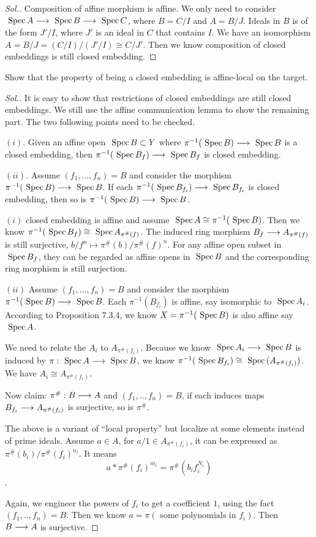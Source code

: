 \documentclass[11pt]{book} %
\begin{document}
\begin{proof}[Sol.]
Composition of affine morphism is affine. We only need to consider $\text{ Spec\,} A\longrightarrow \text{ Spec\,} B\longrightarrow\text{ Spec\,} C $, where $B=C/I$ and $A=B/J$. Ideals in $B$ is of the form $J'/I$, where $J'$ is an ideal in $C$ that contains $I$. We  have an isomorphism $A=B/J=(C/I)/(J'/I)\cong C/J'$. Then we know composition of closed embeddings is still closed embedding.
\end{proof}
\begin{exr}
Show that the property of being a closed embedding is affine-local on the target.
\end{exr}
\begin{proof}[Sol.]
It is easy to show that restrictions of closed embeddings are still closed embeddings. We still use the affine communication lemma to show the remaining part. The two following points need to be checked.

$(i)$. Given an affine open $\text{ Spec\,} B\subset Y$ where $\pi^{-1}(\text{ Spec\,} B)\longrightarrow \text{ Spec\,} B$ is a closed embedding, then $\pi^{-1}(\text{ Spec\,} B_f)\longrightarrow \text{ Spec\,} B_{f}$ is closed embedding.

$(ii)$. Assume $(f_1,...,f_n)=B$ and consider the morphism $\pi^{-1}(\text{ Spec\,} B)\longrightarrow \text{ Spec\,} B$. If each $\pi^{-1}(\text{ Spec\,} B_{f_i})\longrightarrow \text{ Spec\,} B_{f_i}$ is closed embedding, then so is $\pi^{-1}(\text{ Spec\,} B)\longrightarrow \text{ Spec\,} B$. 

$(i)$ closed embedding is affine and assume $\text{ Spec\,} A\cong \pi^{-1}(\text{ Spec\,} B)$. Then we know $\pi^{-1}(\text{ Spec\,} B_f)\cong \text{ Spec\,} A_{\pi^\#(f)}$. The induced ring morphism $B_f\longrightarrow A_{\pi^\#(f)}$ is still surjective, $b/f^n\mapsto \pi^\#(b)/\pi^{\#}(f)^n$. For any affine open subset in $\text{ Spec\,} B_{f}$, they can be regarded as affine opens in $\text{ Spec\,} B$ and the corresponding ring morphism is still surjection.

$(ii)$ Assume $(f_1,...,f_n)=B$ and consider the morphism $\pi^{-1}(\text{ Spec\,} B)\longrightarrow \text{ Spec\,} B$. Each $\pi^{-1}(B_{f_i})$ is affine, say isomorphic to $\text{ Spec\,} A_i$. According to Proposition 7.3.4, we know $X=\pi^{-1}(\text{ Spec\,} B)$ is also affine say $\text{ Spec\,} A$.

We need to relate the $A_i$ to $A_{\pi^\#(f_i)}$. Because we know $\text{ Spec\,} A_i\longrightarrow \text{ Spec\,} B$ is induced by $\pi:\text{ Spec\,} A\longrightarrow \text{ Spec\,} B$, we know $\pi^{-1}(\text{ Spec\,} B_{f_i})\cong \text{ Spec\,} (A_{\pi^{\#}(f_i)})$. We have $A_i\cong A_{\pi^\#(f_i)}$.

Now claim: $\pi^\#:B\longrightarrow A$ and $(f_1,..,f_n)=B$, if each induces maps $B_{f_i}\longrightarrow A_{\pi^{\#}(f_i)}$ is surjective, so is $\pi^\#$.

The above is a variant of ``local property'' but localize at some elements instead of prime ideals. Assume $a\in A$, for $a/1\in A_{\pi^{\#}(f_i)}$, it can be expressed as $\pi^\#(b_i)/\pi^\#(f_i)^{n_i}$. It means
 $$a*\pi^\#(f_{i})^{m_i}= \pi^\#(b_i f_{i}^{N_i})$$.

Again, we engineer the powers of $f_i$ to get a coefficient $1$, using the fact $(f_1,..,f_n)=B$. Then we know $a=\pi(\text{ some polynomials in $f_i$})$. Then $B\longrightarrow A$ is surjective.
\end{proof}
\end{document}
